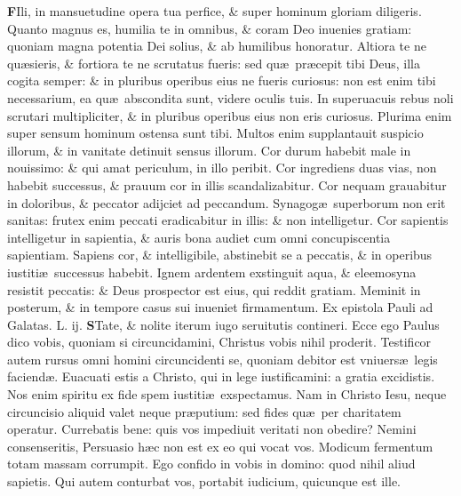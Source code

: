 \documentclass[a5paper,10pt]{book}
\def\leftmarginnote{%
	\lrmarginnote{\hskip -\marginparsep \hskip -6.5em}}
\def\rightmarginnote{%
	\lrmarginnote{\hskip\columnwidth \hskip -1em}}
\def\ae{æ}
\begin{document}
\begin{multicols*}{2}
\vspace{-.25em}
\lettrine[lines=2]{\bfseries F}{}Ili, in\rightmarginnote{ca. 3.} mansuetudine opera tua perfice, \& super hominum gloriam diligeris.
Quanto magnus es, humilia te in
omnibus, \& coram Deo inuenies gratiam: quoniam magna potentia Dei solius, \& ab humilibus honoratur.
Altiora te ne qu\ae sieris, \& fortiora te ne scrutatus fueris: sed qu\ae \ pr\ae cepit tibi Deus, illa cogita semper: \& in pluribus operibus eius ne fueris curiosus: non est enim tibi necessarium, ea qu\ae \ abscondita sunt, videre oculis tuis.
In superuacuis rebus noli scrutari multipliciter, \& in pluribus operibus eius non eris curiosus. Plurima enim super sensum hominum ostensa sunt tibi.
Multos enim supplantauit suspicio illorum, \& in vanitate detinuit sensus illorum. Cor durum habebit male in nouissimo: \& qui amat periculum, in illo peribit.
Cor ingrediens duas vias, non habebit successus, \& prauum cor in illis scandalizabitur. Cor nequam grauabitur in doloribus, \& peccator adijciet ad peccandum.
Synagog\ae \ superborum non erit sanitas: frutex enim peccati eradicabitur in illis: \& non intelligetur.
Cor sapientis intelligetur in sapientia, \& auris bona audiet cum omni concupiscentia sapientiam.
Sapiens cor, \& intelligibile, abstinebit se a peccatis, \& in operibus iustiti\ae \ successus habebit.
Ignem ardentem exstinguit aqua, \& eleemosyna resistit peccatis: \& Deus prospector est eius, qui reddit gratiam. Meminit in posterum, \& in tempore casus sui inueniet firmamentum.
\newline {} \color{red} Ex epistola Pauli ad Galatas. \hfill L. ij. \color{black}
\vspace{-.25em}
\lettrine[lines=2]{\bfseries \color{red} S}{}Tate, \& nolite\leftmarginnote{\begin{flushright}ca. 5.\end{flushright}} iterum iugo seruitutis contineri.
Ecce ego Paulus dico vobis, quoniam si circuncidamini, Christus vobis nihil proderit.
Testificor autem rursus omni homini circuncidenti se, quoniam debitor est vniuers\ae \ legis faciend\ae .
Euacuati estis a Christo, qui in lege iustificamini: a gratia excidistis. Nos enim spiritu ex fide spem iustiti\ae \ exspectamus.
Nam in Christo Iesu, neque circuncisio aliquid valet neque pr\ae putium: sed fides qu\ae \ per charitatem operatur.
Currebatis bene: quis vos impediuit veritati non obedire? Nemini consenseritis, Persuasio h\ae c non est ex eo qui vocat vos.
Modicum fermentum totam massam corrumpit. Ego confido in vobis in domino: quod nihil aliud sapietis. Qui autem conturbat vos, portabit iudicium, quicunque est ille.

\end{multicols*}
\end{document}
